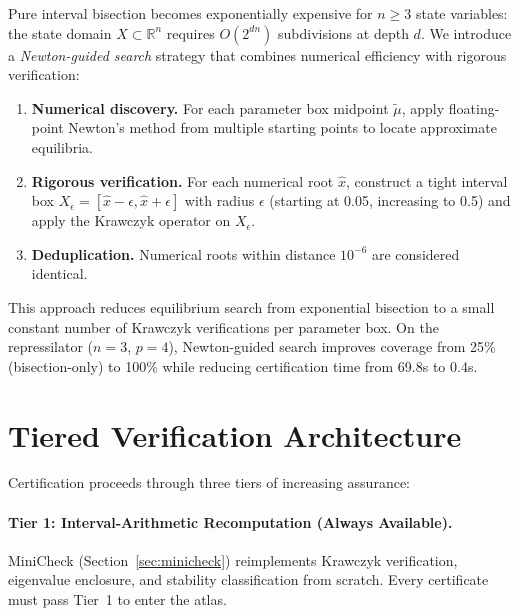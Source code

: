 \documentclass[11pt]{article}
\newcommand{\R}{\mathbb{R}}
\begin{document}
Pure interval bisection becomes exponentially expensive for $n \geq 3$ state variables: the state domain $X \subset \R^n$ requires $O(2^{dn})$ subdivisions at depth $d$.
We introduce a \emph{Newton-guided search} strategy that combines numerical efficiency with rigorous verification:

\begin{enumerate}
\item \textbf{Numerical discovery.} For each parameter box midpoint $\tilde{\mu}$, apply floating-point Newton's method from multiple starting points to locate approximate equilibria.

\item \textbf{Rigorous verification.} For each numerical root $\hat{x}$, construct a tight interval box $X_\epsilon = [\hat{x} - \epsilon, \hat{x} + \epsilon]$ with radius $\epsilon$ (starting at 0.05, increasing to 0.5) and apply the Krawczyk operator on $X_\epsilon$.

\item \textbf{Deduplication.} Numerical roots within distance $10^{-6}$ are considered identical.
\end{enumerate}

This approach reduces equilibrium search from exponential bisection to a small constant number of Krawczyk verifications per parameter box.
On the repressilator ($n{=}3$, $p{=}4$), Newton-guided search improves coverage from 25\% (bisection-only) to 100\% while reducing certification time from 69.8s to 0.4s.

\section{Tiered Verification Architecture}
\label{sec:tiered}

Certification proceeds through three tiers of increasing assurance:

\paragraph{Tier 1: Interval-Arithmetic Recomputation (Always Available).}
MiniCheck (Section~\ref{sec:minicheck}) reimplements Krawczyk verification, eigenvalue enclosure, and stability classification from scratch.
Every certificate must pass Tier~1 to enter the atlas.
\end{document}
